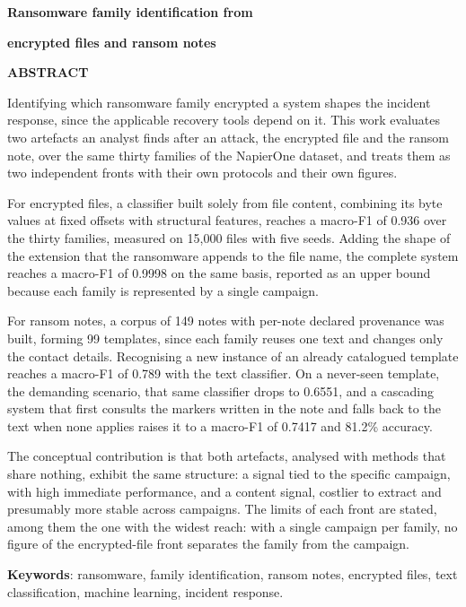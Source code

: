 \centerline{\textbf{\large Ransomware family identification from}}
\centerline{\textbf{\large encrypted files and ransom notes}}

\vspace{2cm}

\vspace{0.5cm}

\vspace{0.5cm}

\noindent
\textbf{ABSTRACT}

\vspace{0.5cm}

\noindent
Identifying which ransomware family encrypted a system shapes the incident response, since the applicable recovery tools depend on it. This work evaluates two artefacts an analyst finds after an attack, the encrypted file and the ransom note, over the same thirty families of the NapierOne dataset, and treats them as two independent fronts with their own protocols and their own figures.

\vspace{0.3cm}

\noindent
For encrypted files, a classifier built solely from file content, combining its byte values at fixed offsets with structural features, reaches a macro-F1 of 0.936 over the thirty families, measured on 15,000 files with five seeds. Adding the shape of the extension that the ransomware appends to the file name, the complete system reaches a macro-F1 of 0.9998 on the same basis, reported as an upper bound because each family is represented by a single campaign.

\vspace{0.3cm}

\noindent
For ransom notes, a corpus of 149 notes with per-note declared provenance was built, forming 99 templates, since each family reuses one text and changes only the contact details. Recognising a new instance of an already catalogued template reaches a macro-F1 of 0.789 with the text classifier. On a never-seen template, the demanding scenario, that same classifier drops to 0.6551, and a cascading system that first consults the markers written in the note and falls back to the text when none applies raises it to a macro-F1 of 0.7417 and 81.2\% accuracy.

\vspace{0.3cm}

\noindent
The conceptual contribution is that both artefacts, analysed with methods that share nothing, exhibit the same structure: a signal tied to the specific campaign, with high immediate performance, and a content signal, costlier to extract and presumably more stable across campaigns. The limits of each front are stated, among them the one with the widest reach: with a single campaign per family, no figure of the encrypted-file front separates the family from the campaign.

\vspace{0.5cm}

\noindent
\textbf{Keywords}: ransomware, family identification, ransom notes, encrypted files, text classification, machine learning, incident response.
